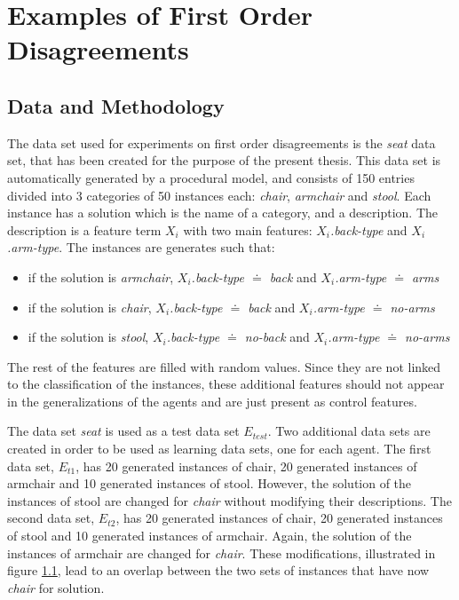 \section{Examples of First Order Disagreements}

\subsection{Data and Methodology}

The data set used for experiments on first order disagreements is the \emph{seat} data set, that has been created for the purpose of the present thesis. This data set is automatically generated by a procedural model, and consists of 150 entries divided into 3 categories of 50 instances each: \emph{chair}, \emph{armchair} and \emph{stool}. Each instance has a solution which is the name of a category, and a description. The description is a feature term $X_{i}$ with two main features: \emph{$X_{i}$.back-type} and \emph{$X_{i}$.arm-type}. The instances are generates such that:

\begin{itemize}
\item if the solution is \emph{armchair}, \emph{$X_{i}$.back-type $\doteq$ back} and \emph{$X_{i}$.arm-type $\doteq$ arms}
\item if the solution is \emph{chair}, \emph{$X_{i}$.back-type $\doteq$ back} and \emph{$X_{i}$.arm-type $\doteq$ no-arms}
\item if the solution is \emph{stool}, \emph{$X_{i}$.back-type $\doteq$ no-back} and \emph{$X_{i}$.arm-type $\doteq$ no-arms}
\end{itemize}

The rest of the features are filled with random values. Since they are not linked to the classification of the instances, these additional features should not appear in the generalizations of the agents and are just present as control features.

The data set \emph{seat} is used as a test data set $E_{test}$. Two additional data sets are created in order to be used as learning data sets, one for each agent. The first data set, $E_{t1}$, has 20 generated instances of chair, 20 generated instances of armchair and  10 generated instances of stool. However, the solution of the instances of stool are changed for \emph{chair} without modifying their descriptions. The second data set, $E_{t2}$, has 20 generated instances of chair, 20 generated instances of stool and  10 generated instances of armchair. Again, the solution of the instances of armchair are changed for \emph{chair}. These modifications, illustrated in figure \ref{}, lead to an overlap between the two sets of instances that have now \emph{chair} for solution.

